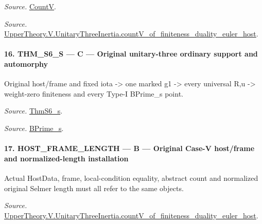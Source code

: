 \emph{Source.} \href{https://github.com/CocoSgt/riemann-hypothesis-lean/blob/7cbf7a0c32fca1badf05931879a37c3f8a2b03b4/src/Development/AutomorphicArithmetic/AutomorphicVarieties/HeightAndVanishing/Counts.lean#L69-L69}{CountV}.

\emph{Source.} \href{https://github.com/CocoSgt/riemann-hypothesis-lean/blob/7cbf7a0c32fca1badf05931879a37c3f8a2b03b4/src/Development/AutomorphicArithmetic/AutomorphicVarieties/ModularityArgument/ThresholdArguments/DenseThresholdCases/CountVOf.lean#L33-L60}{UpperTheory.V.UnitaryThreeInertia.countV\_\allowbreak of\_\allowbreak finiteness\_\allowbreak duality\_\allowbreak euler\_\allowbreak host}.



\paragraph{16. THM\_\allowbreak S6\_\allowbreak S — C — Original unitary-three ordinary support and automorphy}

Original host/frame and fixed iota -> one marked g1 -> every universal R,u -> weight-zero finiteness and every Type-I BPrime\_\allowbreak s point.

\emph{Source.} \href{https://github.com/CocoSgt/riemann-hypothesis-lean/blob/7cbf7a0c32fca1badf05931879a37c3f8a2b03b4/src/Development/AutomorphicArithmetic/AutomorphicVarieties/ModularityArgument/ThresholdArguments/DenseThresholdCases/ThmS6CoreS.lean#L17-L26}{ThmS6\_\allowbreak s}.

\emph{Source.} \href{https://github.com/CocoSgt/riemann-hypothesis-lean/blob/7cbf7a0c32fca1badf05931879a37c3f8a2b03b4/src/Development/AutomorphicArithmetic/AutomorphicVarieties/ModularityArgument/ThresholdArguments/DenseThresholdCases/ThmS6CoreS.lean#L12-L16}{BPrime\_\allowbreak s}.



\paragraph{17. HOST\_\allowbreak FRAME\_\allowbreak LENGTH — B — Original Case-V host/frame and normalized-length installation}

Actual HostData, frame, local-condition equality, abstract count and normalized original Selmer length must all refer to the same objects.

\emph{Source.} \href{https://github.com/CocoSgt/riemann-hypothesis-lean/blob/7cbf7a0c32fca1badf05931879a37c3f8a2b03b4/src/Development/AutomorphicArithmetic/AutomorphicVarieties/ModularityArgument/ThresholdArguments/DenseThresholdCases/CountVOf.lean#L33-L60}{UpperTheory.V.UnitaryThreeInertia.countV\_\allowbreak of\_\allowbreak finiteness\_\allowbreak duality\_\allowbreak euler\_\allowbreak host}.




